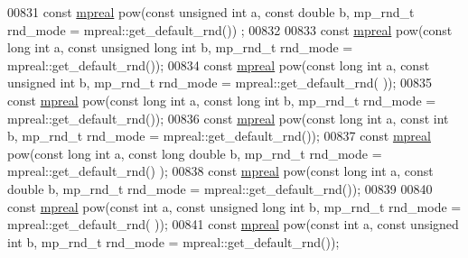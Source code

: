 \begin{DoxyCode}
00831 \textcolor{keyword}{const} \hyperlink{classmpfr_1_1mpreal}{mpreal} pow(\textcolor{keyword}{const} \textcolor{keywordtype}{unsigned} \textcolor{keywordtype}{int} a, \textcolor{keyword}{const} \textcolor{keywordtype}{double} b, mp\_rnd\_t rnd\_mode = mpreal::get\_default\_rnd())
      ;
00832 
00833 \textcolor{keyword}{const} \hyperlink{classmpfr_1_1mpreal}{mpreal} pow(\textcolor{keyword}{const} \textcolor{keywordtype}{long} \textcolor{keywordtype}{int} a, \textcolor{keyword}{const} \textcolor{keywordtype}{unsigned} \textcolor{keywordtype}{long} \textcolor{keywordtype}{int} b, mp\_rnd\_t rnd\_mode = 
      mpreal::get\_default\_rnd());
00834 \textcolor{keyword}{const} \hyperlink{classmpfr_1_1mpreal}{mpreal} pow(\textcolor{keyword}{const} \textcolor{keywordtype}{long} \textcolor{keywordtype}{int} a, \textcolor{keyword}{const} \textcolor{keywordtype}{unsigned} \textcolor{keywordtype}{int} b, mp\_rnd\_t rnd\_mode = mpreal::get\_default\_rnd(
      ));
00835 \textcolor{keyword}{const} \hyperlink{classmpfr_1_1mpreal}{mpreal} pow(\textcolor{keyword}{const} \textcolor{keywordtype}{long} \textcolor{keywordtype}{int} a, \textcolor{keyword}{const} \textcolor{keywordtype}{long} \textcolor{keywordtype}{int} b, mp\_rnd\_t rnd\_mode = mpreal::get\_default\_rnd());
00836 \textcolor{keyword}{const} \hyperlink{classmpfr_1_1mpreal}{mpreal} pow(\textcolor{keyword}{const} \textcolor{keywordtype}{long} \textcolor{keywordtype}{int} a, \textcolor{keyword}{const} \textcolor{keywordtype}{int} b, mp\_rnd\_t rnd\_mode = mpreal::get\_default\_rnd());
00837 \textcolor{keyword}{const} \hyperlink{classmpfr_1_1mpreal}{mpreal} pow(\textcolor{keyword}{const} \textcolor{keywordtype}{long} \textcolor{keywordtype}{int} a, \textcolor{keyword}{const} \textcolor{keywordtype}{long} \textcolor{keywordtype}{double} b, mp\_rnd\_t rnd\_mode = mpreal::get\_default\_rnd()
      );
00838 \textcolor{keyword}{const} \hyperlink{classmpfr_1_1mpreal}{mpreal} pow(\textcolor{keyword}{const} \textcolor{keywordtype}{long} \textcolor{keywordtype}{int} a, \textcolor{keyword}{const} \textcolor{keywordtype}{double} b, mp\_rnd\_t rnd\_mode = mpreal::get\_default\_rnd());
00839 
00840 \textcolor{keyword}{const} \hyperlink{classmpfr_1_1mpreal}{mpreal} pow(\textcolor{keyword}{const} \textcolor{keywordtype}{int} a, \textcolor{keyword}{const} \textcolor{keywordtype}{unsigned} \textcolor{keywordtype}{long} \textcolor{keywordtype}{int} b, mp\_rnd\_t rnd\_mode = mpreal::get\_default\_rnd(
      ));
00841 \textcolor{keyword}{const} \hyperlink{classmpfr_1_1mpreal}{mpreal} pow(\textcolor{keyword}{const} \textcolor{keywordtype}{int} a, \textcolor{keyword}{const} \textcolor{keywordtype}{unsigned} \textcolor{keywordtype}{int} b, mp\_rnd\_t rnd\_mode = mpreal::get\_default\_rnd());

\end{DoxyCode}
